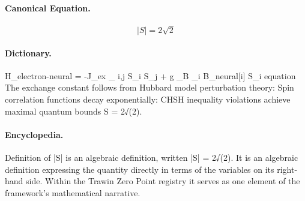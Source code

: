 \paragraph{Canonical Equation.}
\[
|S| = 2\sqrt{2}
\]

\paragraph{Dictionary.}
H\_electron-neural = -J\_ex \_ i,j S\_i S\_j + g \_B \_i B\_neural[i] S\_i equation The exchange constant follows from Hubbard model perturbation theory: Spin correlation functions decay exponentially: CHSH inequality violations achieve maximal quantum bounds S = 2√(2).

\paragraph{Encyclopedia.}
Definition of |S| is an algebraic definition, written |S| = 2√(2). It is an algebraic definition expressing the quantity directly in terms of the variables on its right-hand side. Within the Trawin Zero Point registry it serves as one element of the framework's mathematical narrative.
